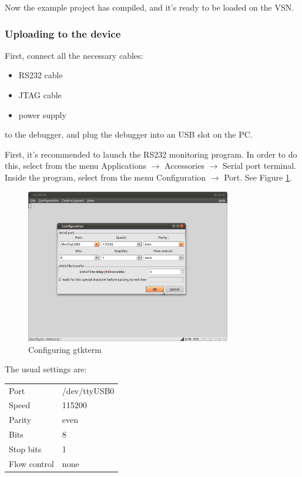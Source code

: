 \documentclass[a4paper, 10pt]{article}
\begin{document}
Now the example project has compiled, and it's ready to be loaded on the VSN.

\subsubsection{Uploading to the device}

First, connect all the necessary cables:
    \begin{itemize}
    \item RS232 cable
    \item JTAG cable
    \item power supply
    \end{itemize}
to the debugger, and plug the debugger into an USB slot on the PC.

First, it's recommended to launch the RS232 monitoring program.
In order to do this, select from the menu
Applications $\rightarrow$ Accessories $\rightarrow$ Serial port terminal.
Inside the program, select from the menu 
Configuration $\rightarrow$ Port.
See Figure \ref{fig:gtkterm-config}.

    \begin{figure}[H]
    \centering
        \includegraphics[width=0.8\textwidth]{./png-install-guide/gtkterm-config.png}
        \caption{Configuring gtkterm}
        \label{fig:gtkterm-config}
    \end{figure}

The usual settings are:
    
    \smallskip
    \begin{tabular}{ l l }
    Port         & /dev/ttyUSB0 \\
    Speed        & 115200       \\
    Parity       & even         \\
    Bits         & 8            \\
    Stop bits    & 1            \\
    Flow control & none         \\
    \end{tabular}
    \smallskip
\end{document}
